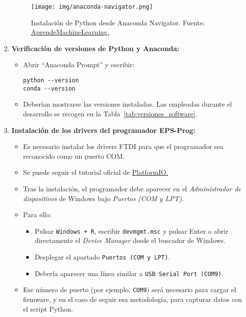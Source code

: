\begin{enumerate}
  \begin{figure}[H]
  \centering
  \texttt{[image: img/anaconda-navigator.png]}
  \caption{Instalación de Python desde Anaconda Navigator. Fuente: \href{https://www.aprendemachinelearning.com/instalar-ambiente-de-desarrollo-python-anaconda-para-aprendizaje-automatico/}{AprendeMachineLearning.}}
  \label{fig:anaconda_instalacion}
\end{figure}

  \item \textbf{Verificación de versiones de Python y Anaconda:}
  \begin{itemize}
    \item Abrir “Anaconda Prompt” y escribir:
    \begin{verbatim}
python --version
conda --version
    \end{verbatim}
    \item Deberían mostrarse las versiones instaladas. Las empleadas durante el desarrollo se recogen en la Tabla~\ref{tab:versiones_software}.
  \end{itemize}

  \item \textbf{Instalación de los drivers del programador EPS-Prog:}
  \begin{itemize}
    \item Es necesario instalar los drivers FTDI para que el programador sea reconocido como un puerto COM.
    \item Se puede seguir el tutorial oficial de \href{https://docs.platformio.org/en/stable/plus/debug-tools/esp-prog.html\#drivers}{PlatformIO.}
    \item Tras la instalación, el programador debe aparecer en el \textit{Administrador de dispositivos }de Windows bajo \textit{Puertos (COM y LPT)}.
    \item Para ello:
  \begin{itemize}
    \item Pulsar \texttt{Windows + R}, escribir \texttt{devmgmt.msc} y pulsar Enter o abrir directamente el \textit{Device Manager }desde el buscador de Windows.
    \item Desplegar el apartado \texttt{Puertos (COM y LPT)}.
    \item Debería aparecer una línea similar a \texttt{USB Serial Port (COM9)}.
  \end{itemize}
  \item Ese número de puerto (por ejemplo, \texttt{COM9}) será necesario para cargar el firmware, y en el caso de seguir esa metodología, para capturar datos con el script Python.
  \end{itemize}
\end{enumerate}

